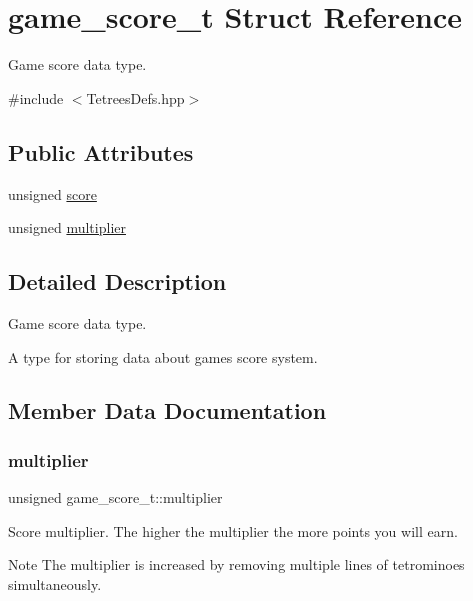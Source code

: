 \hypertarget{structgame__score__t}{}\section{game\+\_\+score\+\_\+t Struct Reference}
\label{structgame__score__t}


Game score data type.  




{\ttfamily \#include $<$Tetrees\+Defs.\+hpp$>$}

\subsection*{Public Attributes}
\begin{DoxyCompactItemize}
\item 
unsigned \hyperlink{structgame__score__t_ad31c74c891223f5649797cbd13a86de8}{score}
\item 
unsigned \hyperlink{structgame__score__t_a9dbd70f0cf1f4258895ff90db228297d}{multiplier}
\end{DoxyCompactItemize}


\subsection{Detailed Description}
Game score data type. 

A type for storing data about game\textquotesingle{}s score system. 

\subsection{Member Data Documentation}
\mbox{\label{structgame__score__t_a9dbd70f0cf1f4258895ff90db228297d}} 
\subsubsection{\texorpdfstring{multiplier}{multiplier}}
{\footnotesize\ttfamily unsigned game\+\_\+score\+\_\+t\+::multiplier}

Score multiplier. The higher the multiplier the more points you will earn. \begin{DoxyNote}{Note}
The multiplier is increased by removing multiple lines of tetrominoes simultaneously. 
\end{DoxyNote}
\mbox{\label{structgame__score__t_ad31c74c891223f5649797cbd13a86de8}} 
